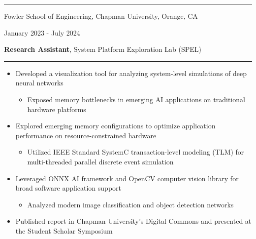 \documentclass[letter]{article}
\begin{document}
    \vspace{4pt}
    \hrule height 1pt
    \vspace{4pt}
    \noindent
    \begin{minipage}[c]{0.65\linewidth}
        \noindent Fowler School of Engineering, Chapman University, Orange, CA
    \end{minipage}
    \begin{minipage}[c]{0.345\linewidth}
        \begin{flushright}
            January 2023 - July 2024
        \end{flushright}
    \end{minipage}
    \begin{minipage}[c]{0.65\linewidth}
        \noindent \textbf{Research Assistant}, System Platform Exploration Lab (SPEL)
    \end{minipage}
    \noindent
    \vspace{4pt}
    \hrule
    \vspace{4pt}
    \noindent
    \begin{itemize}[noitemsep, topsep=0pt]
        \item Developed a visualization tool for analyzing system-level simulations of deep neural networks
            \begin{itemize}[noitemsep, topsep=0pt]
            \item Exposed memory bottlenecks in emerging AI applications on traditional hardware platforms
            \end{itemize}
        \item Explored emerging memory configurations to optimize application performance on resource-constrained hardware
            \begin{itemize}[noitemsep, topsep=0pt]
            \item  Utilized IEEE Standard SystemC transaction-level modeling (TLM) for multi-threaded parallel discrete event simulation
            \end{itemize}
        \item Leveraged ONNX AI framework and OpenCV computer vision library for broad software application support
            \begin{itemize}[noitemsep, topsep=0pt]
            \item Analyzed modern image classification and object detection networks
            \end{itemize}
        \item Published report in Chapman University's Digital Commons and presented at the Student Scholar Symposium
    \end{itemize}
    \medskip
\end{document}
